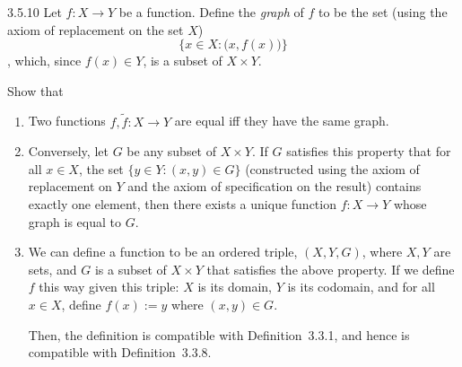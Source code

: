 \begin{exercise}{3.5.10}
	Let $f: X \to Y$ be a function. Define the \emph{graph} of $f$ to be the set (using the axiom of replacement on the set $X$)
	\[
		\{x \in X : \bigl(x,f(x)\bigr)\}
	\]
	, which, since $f(x) \in Y$, is a subset of $X \times Y$.
	
	Show that
	\begin{enumerate}
		\item Two functions $f,\tilde{f} : X \to Y$ are equal iff they have the same graph.
		\item Conversely, let $G$ be any subset of $X \times Y$. If $G$ satisfies this property that for all $x \in X$, the set $\{y \in Y: (x,y) \in G\}$ (constructed using the axiom of replacement on $Y$ and the axiom of specification on the result) contains exactly one element, then there exists a unique function $f: X \to Y$ whose graph is equal to $G$.
		\item We can define a function to be an ordered triple, $(X,Y,G)$, where $X,Y$ are sets, and $G$ is a subset of $X \times Y$ that satisfies the above property. If we define $f$ this way given this triple: $X$ is its domain, $Y$ is its codomain, and for all $x \in X$, define $f(x) := y$ where $(x,y) \in G$.
		
		Then, the definition is compatible with Definition~3.3.1, and hence is compatible with Definition~3.3.8.
	\end{enumerate}
\end{exercise}
